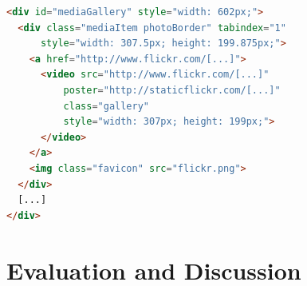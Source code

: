 \documentclass{sig-alternate}
\begin{document}
\begin{lstlisting}[caption={Simplified \emph{Strict Order, Equal Size}
  HTML code}, label=code:mediagalleryhtml, language=HTML]
<div id="mediaGallery" style="width: 602px;">
  <div class="mediaItem photoBorder" tabindex="1"
      style="width: 307.5px; height: 199.875px;">
    <a href="http://www.flickr.com/[...]">
      <video src="http://www.flickr.com/[...]"
          poster="http://staticflickr.com/[...]"
          class="gallery"
          style="width: 307px; height: 199px;">
      </video>
    </a>
    <img class="favicon" src="flickr.png">
  </div>
  [...]
</div>
\end{lstlisting}

\section{Evaluation and Discussion}
\label{sec:evaluation-and-discussion}
\selectfont
\end{document}
